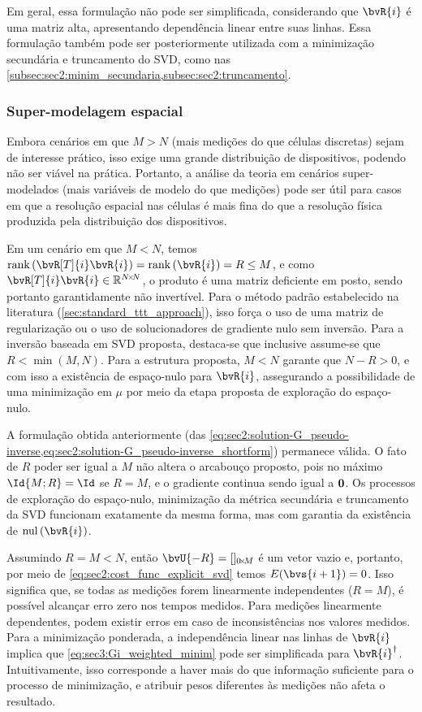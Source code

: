 Em geral, essa formulação não pode ser simplificada, considerando que $\bvR{i}$ é uma matriz alta, apresentando dependência linear entre suas linhas. Essa formulação também pode ser posteriormente utilizada com a minimização secundária e truncamento do SVD, como nas \cref{subsec:sec2:minim_secundaria,subsec:sec2:truncamento}.

\subsubsection{Super-modelagem espacial}
\label{subsec:spatial_under-over-_modeling}

Embora cenários em que $M > N$ (mais medições do que células discretas) sejam de interesse prático, isso exige uma grande distribuição de dispositivos, podendo não ser viável na prática. Portanto, a análise da teoria em cenários super-modelados (mais variáveis de modelo do que medições) pode ser útil para casos em que a resolução espacial nas células é mais fina do que a resolução física produzida pela distribuição dos dispositivos.

Em um cenário em que $M < N$, temos $\rank{\bvR[T]{i} \bvR{i}} = \rank{\bvR{i}} = R \leq M$, e como $\bvR[T]{i} \bvR{i} \in \re^{\sz{N}{N}}$, o produto é uma matriz deficiente em posto, sendo portanto garantidamente não invertível. Para o método padrão estabelecido na literatura (\cref{sec:standard_ttt_approach}), isso força o uso de uma matriz de regularização ou o uso de solucionadores de gradiente nulo sem inversão. Para a inversão baseada em SVD proposta, destaca-se que inclusive assume-se que $R < \min(M,N)$. Para a estrutura proposta, $M < N$ garante que $N-R > 0$, e com isso a existência de espaço-nulo para $\bvR{i}$, assegurando a possibilidade de uma minimização em $\mu$ por meio da etapa proposta de exploração do espaço-nulo.

A formulação obtida anteriormente (das \cref{eq:sec2:solution-G_pseudo-inverse,eq:sec2:solution-G_pseudo-inverse_shortform}) permanece válida. O fato de $R$ poder ser igual a $M$ não altera o arcabouço proposto, pois no máximo $\Id{M;R} = \Id$ se $R = M$, e o gradiente continua sendo igual a $\bv0$. Os processos de exploração do espaço-nulo, minimização da métrica secundária e truncamento da SVD funcionam exatamente da mesma forma, mas com garantia da existência de $\nul{\bvR{i}}$.

Assumindo $R = M < N$, então $\bvU{-R} = []_{\sz{0}{M}}$ é um vetor vazio e, portanto, por meio de \cref{eq:sec2:cost_func_explicit_svd} temos $E(\bvs{i+1}) = 0$. Isso significa que, se todas as medições forem linearmente independentes ($R=M$), é possível alcançar erro zero nos tempos medidos. Para medições linearmente dependentes, podem existir erros em caso de inconsistências nos valores medidos. Para a minimização ponderada, a independência linear nas linhas de $\bvR{i}$ implica que \cref{eq:sec3:Gi_weighted_minim} pode ser simplificada para $\pinv{\bvR{i}}$. Intuitivamente, isso corresponde a haver mais do que informação suficiente para o processo de minimização, e atribuir pesos diferentes às medições não afeta o resultado.

